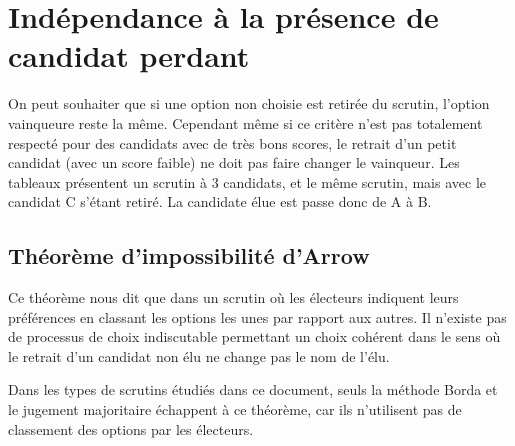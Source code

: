 \documentclass[../report]{subfiles}
\begin{document}
  \section{Indépendance à la présence de candidat perdant}

  On peut souhaiter que si une option non choisie est retirée du scrutin, l'option vainqueure reste
  la même.
  Cependant même si ce critère n'est pas totalement respecté pour des candidats avec de très bons 
  scores, le retrait d'un petit candidat (avec un score faible) ne doit pas faire changer 
  le vainqueur.
  Les tableaux  présentent un scrutin à 3 candidats, et le même 
  scrutin, mais avec le candidat C s'étant retiré. La candidate élue est passe donc de A à B.

  \subsection{Théorème d'impossibilité d'Arrow}

  Ce théorème nous dit que dans un scrutin où les électeurs indiquent leurs préférences en classant les
  options les unes par rapport aux autres.
  Il n'existe pas de processus de choix indiscutable permettant un choix 
  cohérent dans le sens où le retrait d'un candidat non élu ne change pas le nom de l'élu.

  Dans les types de scrutins étudiés dans ce document, seuls la méthode Borda et le 
  jugement majoritaire échappent à ce théorème, car ils n'utilisent pas de classement des 
  options par les électeurs.
  
\end{document}
